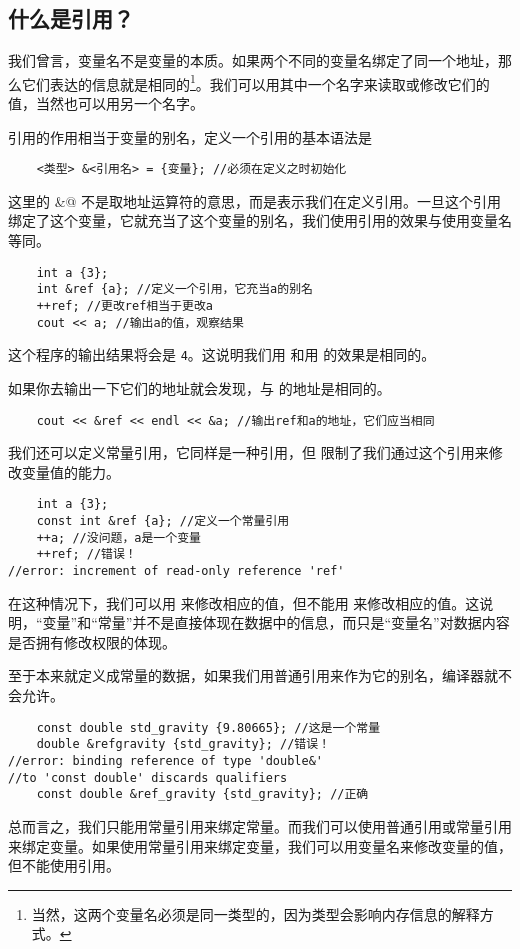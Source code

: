 \subsection*{什么是引用？}
我们曾言，变量名不是变量的本质。如果两个不同的变量名绑定了同一个地址，那么它们表达的信息就是相同的\footnote{当然，这两个变量名必须是同一类型的，因为类型会影响内存信息的解释方式。}。我们可以用其中一个名字来读取或修改它们的值，当然也可以用另一个名字。\par
引用的作用相当于变量的别名，定义一个引用的基本语法是
\begin{lstlisting}
    <类型> &<引用名> = {变量}; //必须在定义之时初始化
\end{lstlisting}
这里的 \lstinline@&@ 不是取地址运算符的意思，而是表示我们在定义引用。一旦这个引用绑定了这个变量，它就充当了这个变量的别名，我们使用引用的效果与使用变量名等同。
\begin{lstlisting}
    int a {3};
    int &ref {a}; //定义一个引用，它充当a的别名
    ++ref; //更改ref相当于更改a
    cout << a; //输出a的值，观察结果
\end{lstlisting}
这个程序的输出结果将会是 \texttt{4}。这说明我们用 \lstinline@ref@ 和用 \lstinline@a@ 的效果是相同的。\par
如果你去输出一下它们的地址就会发现，\lstinline@ref@ 与 \lstinline@a@ 的地址是相同的。
\begin{lstlisting}
    cout << &ref << endl << &a; //输出ref和a的地址，它们应当相同
\end{lstlisting}\par
我们还可以定义常量引用，它同样是一种引用，但 \lstinline@const@ 限制了我们通过这个引用来修改变量值的能力。
\begin{lstlisting}
    int a {3};
    const int &ref {a}; //定义一个常量引用
    ++a; //没问题，a是一个变量
    ++ref; //错误！
//error: increment of read-only reference 'ref'
\end{lstlisting}
在这种情况下，我们可以用 \lstinline@a@ 来修改相应的值，但不能用 \lstinline@ref@ 来修改相应的值。这说明，``变量''和``常量''并不是直接体现在数据中的信息，而只是``变量名''对数据内容是否拥有修改权限的体现。\par
至于本来就定义成常量的数据，如果我们用普通引用来作为它的别名，编译器就不会允许。
\begin{lstlisting}
    const double std_gravity {9.80665}; //这是一个常量
    double &refgravity {std_gravity}; //错误！
//error: binding reference of type 'double&'
//to 'const double' discards qualifiers
    const double &ref_gravity {std_gravity}; //正确
\end{lstlisting}
总而言之，我们只能用常量引用来绑定常量。而我们可以使用普通引用或常量引用来绑定变量。如果使用常量引用来绑定变量，我们可以用变量名来修改变量的值，但不能使用引用。\par
